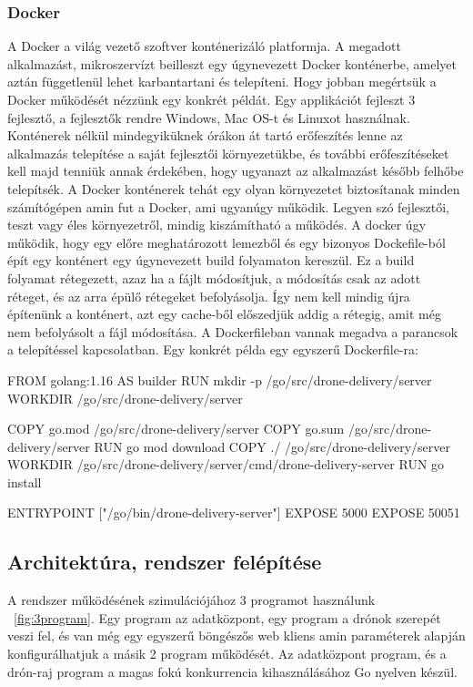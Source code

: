 \subsubsection{Docker}
A Docker a világ vezető szoftver konténerizáló platformja.
A megadott alkalmazást, mikroszervízt beilleszt egy úgynevezett Docker konténerbe, amelyet aztán függetlenül lehet karbantartani és telepíteni.
Hogy jobban megértsük a Docker működését nézzünk egy konkrét példát.
Egy applikációt fejleszt 3 fejlesztő, a fejlesztők rendre Windows, Mac OS-t és Linuxot használnak.
Konténerek nélkül mindegyiküknek órákon át tartó erőfeszítés lenne az alkalmazás telepítése a saját fejlesztői környezetükbe, és további erőfeszítéseket kell majd tenniük annak érdekében, hogy ugyanazt az alkalmazást később felhőbe telepítsék.
A Docker konténerek tehát egy olyan környezetet biztosítanak minden számítógépen amin fut a Docker, ami ugyanúgy működik.
Legyen szó fejlesztői, teszt vagy éles környezetről, mindig kiszámítható a működés.
A docker úgy működik, hogy egy előre meghatározott lemezből és egy bizonyos Dockefile-ból épít egy konténert egy úgynevezett build folyamaton kereszül.
Ez a build folyamat rétegezett, azaz ha a fájlt módosítjuk, a módosítás csak az adott réteget, és az arra épülő rétegeket befolyásolja.
Így nem kell mindig újra építenünk a konténert, azt egy cache-ből előszedjük addig a rétegig, amit még nem befolyásolt a fájl módosítása.
A Dockerfileban vannak megadva a parancsok a telepítéssel kapcsolatban.
Egy konkrét példa egy egyszerű Dockerfile-ra:
\begin{docker}
    FROM golang:1.16 AS builder
    RUN mkdir -p /go/src/drone-delivery/server
    WORKDIR /go/src/drone-delivery/server

    COPY go.mod /go/src/drone-delivery/server
    COPY go.sum /go/src/drone-delivery/server
    RUN go mod download
    COPY ./ /go/src/drone-delivery/server
    WORKDIR /go/src/drone-delivery/server/cmd/drone-delivery-server
    RUN go install

    ENTRYPOINT ["/go/bin/drone-delivery-server"]
    EXPOSE 5000
    EXPOSE 50051
\end{docker}


\subsection{Architektúra, rendszer felépítése}\label{subsec:architektúra-program-felépítés}
A rendszer működésének szimulációjához 3 programot használunk ~\ref{fig:3program}.
Egy program az adatközpont, egy program a drónok szerepét veszi fel, és van még egy egyszerű böngészős web kliens amin paraméterek alapján konfigurálhatjuk a másik 2 program működését.
Az adatközpont program, és a drón-raj program a magas fokú konkurrencia kihasználásához Go nyelven készül.

